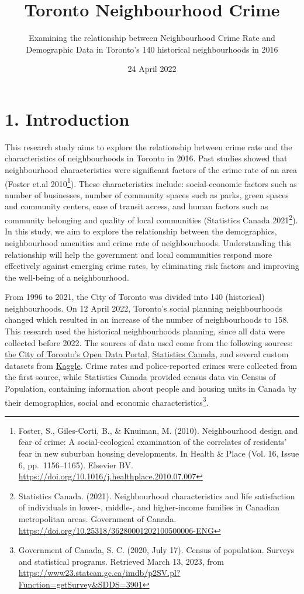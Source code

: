 \documentclass[
]{article}
\title{Toronto Neighbourhood Crime}
\subtitle{Examining the relationship between Neighbourhood Crime Rate
and Demographic Data in Toronto's 140 historical neighbourhoods in 2016}
\author{}
\date{\vspace{-2.5em}24 April 2022}
\begin{document}
\maketitle

{
\setcounter{tocdepth}{2}
\tableofcontents
}
\hypertarget{introduction}{%
\section{1. Introduction}\label{introduction}}

This research study aims to explore the relationship between crime rate
and the characteristics of neighbourhoods in Toronto in 2016. Past
studies showed that neighbourhood characteristics were significant
factors of the crime rate of an area (Foster et.al 2010\footnote{Foster,
  S., Giles-Corti, B., \& Knuiman, M. (2010). Neighbourhood design and
  fear of crime: A social-ecological examination of the correlates of
  residents' fear in new suburban housing developments. In Health \&
  Place (Vol. 16, Issue 6, pp.~1156--1165). Elsevier BV.
  \url{https://doi.org/10.1016/j.healthplace.2010.07.007}}). These
characteristics include: social-economic factors such as number of
businesses, number of community spaces such as parks, green spaces and
community centers, ease of transit access, and human factors such as
community belonging and quality of local communities (Statistics Canada
2021\footnote{Statistics Canada. (2021). Neighbourhood characteristics
  and life satisfaction of individuals in lower-, middle-, and
  higher-income families in Canadian metropolitan areas. Government of
  Canada. \url{https://doi.org/10.25318/36280001202100500006-ENG}}). In
this study, we aim to explore the relationship between the demographics,
neighbourhood amenities and crime rate of neighbourhoods. Understanding
this relationship will help the government and local communities respond
more effectively against emerging crime rates, by eliminating risk
factors and improving the well-being of a neighbourhood.

From 1996 to 2021, the City of Toronto was divided into 140 (historical)
neighbourhoods. On 12 April 2022, Toronto's social planning
neighbourhoods changed which resulted in an increase of the number of
neighbourhoods to 158. This research used the historical neighbourhoods
planning, since all data were collected before 2022. The sources of data
used come from the following sources:
\href{https://www.toronto.ca/city-government/data-research-maps/open-data/}{the
City of Toronto's Open Data Portal},
\href{https://www.statcan.gc.ca/en/start}{Statistics Canada}, and
several custom datasets from \href{https://www.kaggle.com/}{Kaggle}.
Crime rates and police-reported crimes were collected from the first
source, while Statistics Canada provided census data via Census of
Population, containing information about people and housing units in
Canada by their demographics, social and economic
characteristics\footnote{Government of Canada, S. C. (2020, July 17).
  Census of population. Surveys and statistical programs. Retrieved
  March 13, 2023, from
  \url{https://www23.statcan.gc.ca/imdb/p2SV.pl?Function=getSurvey\&SDDS=3901}}.
\end{document}
